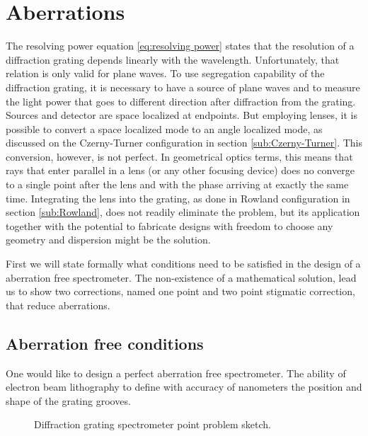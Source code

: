 \documentclass[12pt,twoside,english]{book}
\renewcommand{\~}{\perispomeni}%
\numberwithin{equation}{section}
\numberwithin{figure}{section}
\begin{document}
\section{Aberrations}
The resolving power equation \ref{eq:resolving power} states that the resolution of a diffraction grating depends linearly with the wavelength. Unfortunately, that relation is only valid for plane waves. To use segregation capability of the diffraction grating, it is necessary to have a source of plane waves and to measure the light power that goes to different direction after diffraction from the grating. Sources and detector are space localized at endpoints. But employing lenses, it is possible to convert a space localized mode to an angle localized mode, as discussed on the Czerny-Turner configuration in section \ref{sub:Czerny-Turner}. This conversion, however, is not perfect. In geometrical optics terms, this means that rays that enter parallel in a lens (or any other focusing device) does no converge to a single point after the lens and with the phase arriving at exactly the same time. Integrating the lens into the grating, as done in Rowland configuration in section \ref{sub:Rowland}, does not readily eliminate the problem, but its application together with the potential to fabricate designs with freedom to choose any geometry and dispersion might be the solution.

First we will state formally what conditions need to be satisfied in the design of a aberration free spectrometer. The non-existence of a mathematical solution, lead us to show two corrections, named one point and two point stigmatic correction, that reduce aberrations. 

\subsection{Aberration free conditions}
One would like to design a perfect aberration free spectrometer. The ability of electron beam lithography to define with accuracy of nanometers the position and shape of the grating grooves.

%
\begin{figure}
\centering
\caption{Diffraction grating spectrometer point problem sketch.}
\label{fig:aberration free}
\end{figure}
\end{document}
